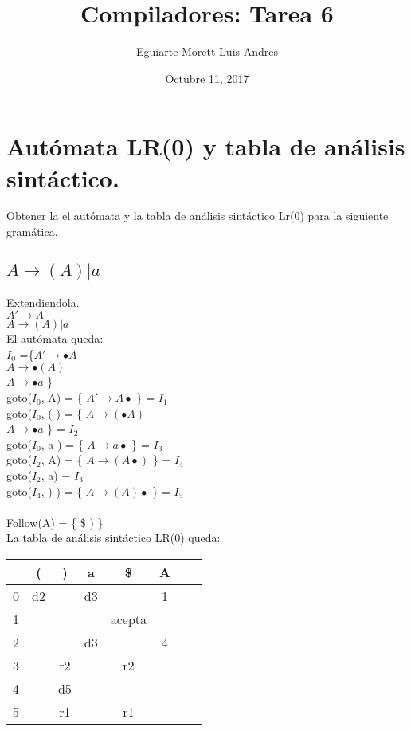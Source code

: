 \documentclass[11pt]{article} %
\title{Compiladores: Tarea 6}
\author{Eguiarte Morett Luis Andres}
\date{Octubre 11, 2017} %
\begin{document}
\maketitle

\section{Autómata LR(0) y tabla de análisis sintáctico.}

Obtener la el autómata y la tabla de análisis sintáctico Lr(0) para la siguiente gramática.

\subsection{$A\rightarrow(A)\vert a$}

Extendiendola.
\\

$A'\rightarrow A$ \\
$A\rightarrow (A)\vert a$ \\ 

El autómata queda:\\

$I_0$ =\{$A'\rightarrow \bullet A$ \\
      	\hspace{3cm}$A\rightarrow \bullet (A)$ \\
	\hspace{3cm}$A\rightarrow \bullet a$ \} \\

goto($I_0$, A) = \{ $A'\rightarrow A \bullet$ \} = $I_1$ \\

goto($I_0$, ( ) = \{ $A\rightarrow (\bullet A)$ \\
			$A \rightarrow \bullet a$ \} = $I_2$ \\

goto($I_0$, a ) = \{ $A \rightarrow a\bullet$ \} = $I_3$ \\

goto($I_2$, A) = \{ $A\rightarrow (A \bullet)$ \} =  $I_4$ \\

goto($I_2$, a) = $I_3$ \\

goto($I_4$, ) ) = \{ $A\rightarrow (A)\bullet$ \} =  $I_5$ \\
\\
Follow(A) = \{ \$ ) \}
\\
La tabla de análisis sintáctico LR(0) queda: \\
\begin{tabular}{l|*{6}{c}r}
                  & ( & ) & a & \$ & A \\
\hline
0 & d2 &  & d3 &   &  1 \\
1 &  &   &   & acepta  &  \\
2 &   &   & d3 &   & 4   \\
3  &  & r2 &  & r2 &  \\
4  &   & d5  &  &   &  \\
5  &   & r1 &  & r1 &  \\
\end{tabular}
\end{document}
